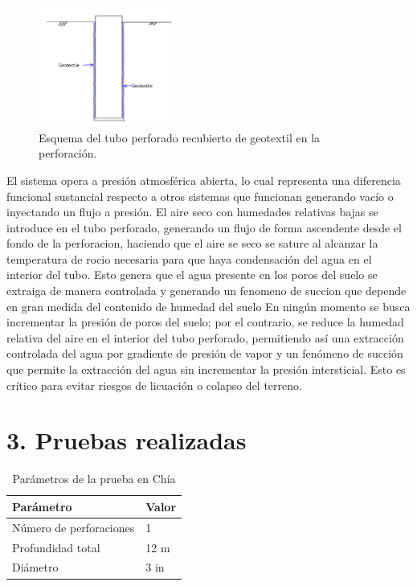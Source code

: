 \documentclass[12pt]{article}
\begin{document}
\begin{figure}[h]
\centering
\includegraphics[width=0.4\textwidth]{images/geotextile.jpg}
\caption{Esquema del tubo perforado recubierto de geotextil en la perforación.}
\label{fig:geotextile}
\end{figure}

El sistema opera a presión atmosférica abierta, lo cual representa una diferencia funcional sustancial respecto a otros sistemas que funcionan generando vacío o inyectando un flujo a presión. El aire seco con humedades relativas bajas se introduce en el tubo perforado, generando un flujo de forma ascendente desde el fondo de la perforacion, haciendo que el aire se seco se sature al alcanzar la temperatura de rocio necesaria para que haya condensación del agua en el interior del tubo. Esto genera que el agua presente en los poros del suelo se extraiga de manera controlada y generando un fenomeno de succion que depende en gran medida del contenido de humedad del suelo En ningún momento se busca incrementar la presión de poros del suelo; por el contrario, se reduce la humedad relativa del aire en el interior del tubo perforado, permitiendo así una extracción controlada del agua por gradiente de presión de vapor y un fenómeno de succión que permite la extracción del agua sin incrementar la presión intersticial. Esto es crítico para evitar riesgos de licuación o colapso del terreno.




\section*{3. Pruebas realizadas}

\begin{table}[H]
\centering
\caption{Parámetros de la prueba en Chía}
\begin{tabular}{ll}
\toprule
\textbf{Parámetro} & \textbf{Valor} \\
\midrule
Número de perforaciones & 1 \\
Profundidad total       & 12 m \\
Diámetro                & 3 in \\
\bottomrule
\end{tabular}
\end{table}
\end{document}
